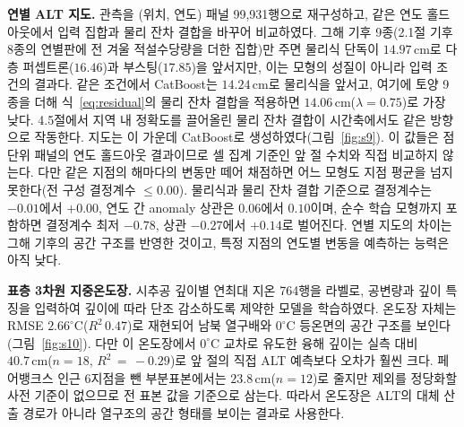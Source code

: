 \documentclass[10pt,twocolumn]{article}
\begin{document}
\textbf{연별 ALT 지도.} 관측을 (위치, 연도) 패널 99{,}931행으로 재구성하고, 같은 연도 홀드아웃에서 입력 집합과 물리 잔차 결합을 바꾸어 비교하였다. 그해 기후 9종(2.1절 기후 8종의 연별판에 전 겨울 적설수당량을 더한 집합)만 주면 물리식 단독이 $14.97\,\mathrm{cm}$로 다층 퍼셉트론($16.46$)과 부스팅($17.85$)을 앞서지만, 이는 모형의 성질이 아니라 입력 조건의 결과다. 같은 조건에서 CatBoost는 $14.24\,\mathrm{cm}$로 물리식을 앞서고, 여기에 토양 9종을 더해 식~\eqref{eq:residual}의 물리 잔차 결합을 적용하면 $14.06\,\mathrm{cm}$($\lambda{=}0.75$)로 가장 낮다. 4.5절에서 지역 내 정확도를 끌어올린 물리 잔차 결합이 시간축에서도 같은 방향으로 작동한다. 지도는 이 가운데 CatBoost로 생성하였다(그림~\ref{fig:s9}). 이 값들은 점 단위 패널의 연도 홀드아웃 결과이므로 셀 집계 기준인 앞 절 수치와 직접 비교하지 않는다. 다만 같은 지점의 해마다의 변동만 떼어 채점하면 어느 모형도 지점 평균을 넘지 못한다(전 구성 결정계수 $\le 0.00$). 물리식과 물리 잔차 결합 기준으로 결정계수는 $-0.01$에서 $+0.00$, 연도 간 anomaly 상관은 $0.06$에서 $0.10$이며, 순수 학습 모형까지 포함하면 결정계수 최저 $-0.78$, 상관 $-0.27$에서 $+0.14$로 벌어진다. 연별 지도의 차이는 그해 기후의 공간 구조를 반영한 것이고, 특정 지점의 연도별 변동을 예측하는 능력은 아직 낮다.

\textbf{표층 3차원 지중온도장.} 시추공 깊이별 연최대 지온 764행을 라벨로, 공변량과 깊이 특징을 입력하여 깊이에 따라 단조 감소하도록 제약한 모델을 학습하였다. 온도장 자체는 RMSE $2.66^\circ\mathrm{C}$($R^2\,0.47$)로 재현되어 남북 열구배와 $0^\circ\mathrm{C}$ 등온면의 공간 구조를 보인다(그림~\ref{fig:s10}). 다만 이 온도장에서 $0^\circ\mathrm{C}$ 교차로 유도한 융해 깊이는 실측 대비 $40.7\,\mathrm{cm}$($n{=}18$, $R^2\,{=}\,{-}0.29$)로 앞 절의 직접 ALT 예측보다 오차가 훨씬 크다. 페어뱅크스 인근 6지점을 뺀 부분표본에서는 $23.8\,\mathrm{cm}$($n{=}12$)로 줄지만 제외를 정당화할 사전 기준이 없으므로 전 표본 값을 기준으로 삼는다. 따라서 온도장은 ALT의 대체 산출 경로가 아니라 열구조의 공간 형태를 보이는 결과로 사용한다.
\end{document}
